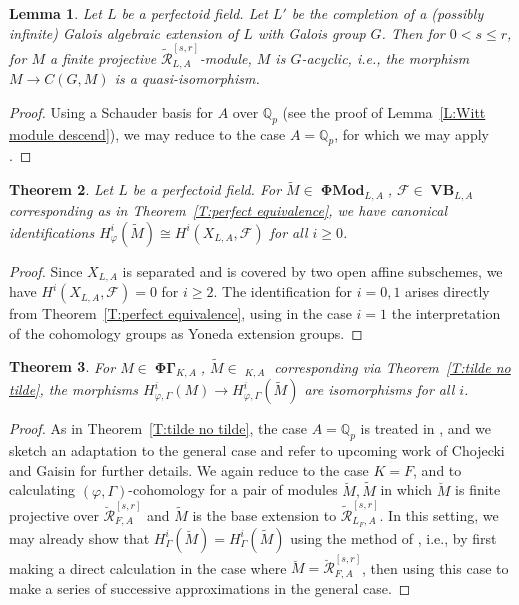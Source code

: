 \documentclass[12pt]{amsart}
\newtheorem{theorem}{Theorem}[section]
\newtheorem{lemma}[theorem]{Lemma}
\theoremstyle{definition}
\numberwithin{equation}{theorem}
\newcommand{\QQ}{\mathbb{Q}}
\newcommand{\calF}{\mathcal{F}}
\newcommand{\calR}{\mathcal{R}}
\DeclareMathOperator{\PhiGamma}{\mathbf{\Phi \Gamma}}
\DeclareMathOperator{\PhiGammatilde}{\widetilde{\mathbf{\Phi \Gamma}}}
\DeclareMathOperator{\PhiMod}{\mathbf{\Phi Mod}}
\DeclareMathOperator{\VB}{\mathbf{VB}}
\begin{document}
\begin{lemma} \label{L:perfect descend cohomology}
Let $L$ be a perfectoid field.
Let $L'$ be the completion of a (possibly infinite) Galois algebraic extension of $L$ with Galois group $G$. Then for $0 < s \leq r$, for $M$ a finite projective $\tilde{\calR}^{[s,r]}_{L,A}$-module, $M$ is $G$-acyclic, i.e.,
the morphism $M \to C(G,M)$ is a quasi-isomorphism.
\end{lemma}
\begin{proof}
Using a Schauder basis for $A$ over $\QQ_p$ (see the proof of Lemma~\ref{L:Witt module descend}), we may reduce to the case $A = \QQ_p$,
for which we may apply \cite[Theorem~8.2.22]{kedlaya-liu1}.
\end{proof}

\begin{theorem}
Let $L$ be a perfectoid field.
For $\tilde{M} \in \PhiMod_{L,A}$, $\calF \in \VB_{L,A}$ corresponding as in
Theorem~\ref{T:perfect equivalence}, we have canonical identifications
$H^i_{\varphi}(\tilde{M}) \cong H^i(X_{L,A}, \calF)$ for all $i \geq 0$.
\end{theorem}
\begin{proof}
Since $X_{L,A}$ is separated and is covered by two open affine subschemes, we have 
$H^i(X_{L,A}, \calF) = 0$ for $i \geq 2$. The identification for $i=0,1$ arises directly
from Theorem~\ref{T:perfect equivalence}, using in the case $i=1$ the interpretation of the cohomology groups as Yoneda extension groups.
\end{proof}


\begin{theorem} \label{T:compare phi Gamma cohomology}
For $M \in \PhiGamma_{K,A}$, $\tilde{M} \in \PhiGammatilde_{K,A}$ corresponding via Theorem~\ref{T:tilde no tilde}, 
the morphisms $H^i_{\varphi, \Gamma}(M) \to H^i_{\varphi, \Gamma}(\tilde{M})$ are isomorphisms for all $i$.
\end{theorem}
\begin{proof}
As in Theorem~\ref{T:tilde no tilde},
the case $A = \QQ_p$ is treated in \cite[Theorem~6.1.7]{kedlaya-liu2}, and we sketch
an adaptation to the general case and refer to upcoming work of Chojecki and Gaisin for further details. We again reduce to the case $K = F$, and to calculating $(\varphi, \Gamma)$-cohomology for a pair of modules $\breve{M}, \tilde{M}$ in which 
$\breve{M}$ is finite projective over $\breve{\calR}^{[s,r]}_{F,A}$
and $\tilde{M}$ is the base extension to $\tilde{\calR}^{[s,r]}_{L_F,A}$.
In this setting, we may already show that $H^i_{\Gamma}(\breve{M}) = H^i_{\Gamma}(\tilde{M})$ using the method of \cite[Lemma 5.6.6]{kedlaya-liu2}, i.e., by first making a direct calculation in the case where $\breve{M} = \breve{\calR}^{[s,r]}_{F,A}$,
then using this case to make a series of successive approximations in the general case.
\end{proof}
\end{document}
